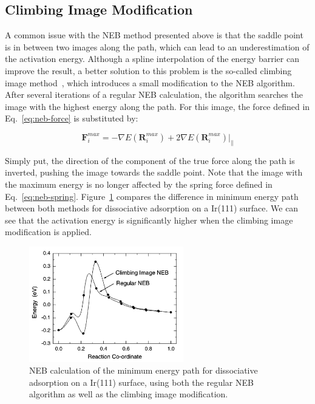 \begin{refsection}

\subsection{Climbing Image Modification}

A common issue with the NEB method presented above is that the saddle point is in between two images along the path, which can lead to an underestimation of the activation energy. Although a spline interpolation of the energy barrier can improve the result, a better solution to this problem is the so-called climbing image method~\cite{Henkelman2000a}, which introduces a small modification to the NEB algorithm. After several iterations of a regular NEB calculation, the algorithm searches the image with the highest energy along the path. For this image, the force defined in Eq.~\ref{eq:neb-force} is substituted by:

\begin{equation}
\mathbf{F}_i^{max} = -\nabla E(\mathbf{R}_i^{max}) + 2\nabla E(\mathbf{R}_i^{max})|_\parallel
\end{equation}

Simply put, the direction of the component of the true force along the path is inverted, pushing the image towards the saddle point. Note that the image with the maximum energy is no longer affected by the spring force defined in Eq.~\ref{eq:neb-spring}. Figure~\ref{fig:neb-climbing} compares the difference in minimum energy path between both methods for  dissociative adsorption on a Ir(111) surface. We can see that the activation energy is significantly higher when the climbing image modification is applied.

\begin{figure}[h]
\centering
\includegraphics[width=0.6\textwidth]{./figures/DFT/ci-neb.png}
\caption{\label{fig:neb-climbing}NEB calculation of the minimum energy path for  dissociative adsorption on a Ir(111) surface, using both the regular NEB algorithm as well as the climbing image modification.~\cite{Henkelman2000a}}
\end{figure}

\printbibliography
\end{refsection}